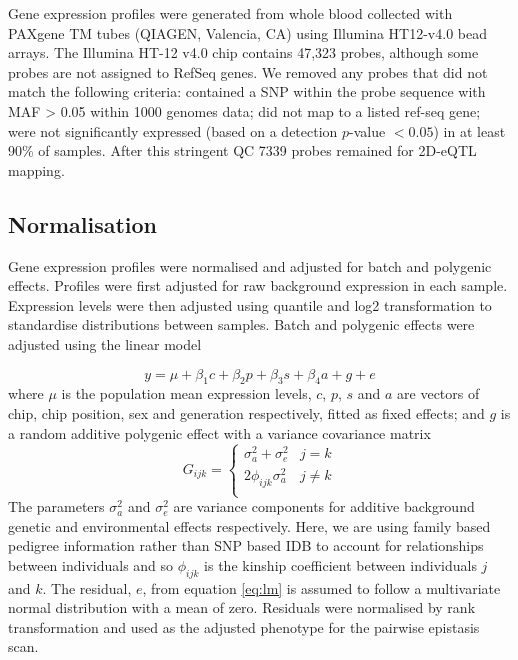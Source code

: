 \documentclass{article}
\begin{document}
Gene expression profiles were generated from whole blood collected with PAXgene TM tubes (QIAGEN, Valencia, CA) using Illumina HT12-v4.0 bead arrays. The Illumina HT-12 v4.0 chip contains 47,323 probes, although some probes are not assigned to RefSeq genes. We removed any probes that did not match the following criteria: contained a SNP within the probe sequence with MAF > 0.05 within 1000 genomes data; did not map to a listed ref-seq gene; were not significantly expressed (based on a detection $p$-value $< 0.05$) in at least 90\% of samples. After this stringent QC 7339 probes remained for 2D-eQTL mapping.


\subsection{Normalisation}

Gene expression profiles were normalised and adjusted for batch and polygenic effects. Profiles were first adjusted for raw background expression in each sample. Expression levels were then adjusted using quantile and log2 transformation to standardise distributions between samples. Batch and polygenic effects were adjusted using the linear model

\begin{equation}
y = \mu + \beta_{1}c + \beta_{2}p + \beta_{3}s + \beta_{4}a + g + e
\label{eq:lm}
\end{equation}
where $\mu$ is the population mean expression levels, $c$, $p$, $s$ and $a$ are vectors of chip, chip position, sex and generation respectively, fitted as fixed effects; and $g$ is a random additive polygenic effect with a variance covariance matrix 
\begin{equation}
G_{ijk} = \left \{ 
\begin{array}{ll}
\sigma _a ^2 + \sigma _e ^2&        j = k \\ 
2\phi _{ijk} \sigma _a ^2& 			j \neq k \\
\end{array} \right.
\end{equation}
The parameters $\sigma_a^2$ and $\sigma_e^2$ are variance components for additive background genetic and environmental effects respectively. Here, we are using family based pedigree information rather than SNP based IDB to account for relationships between individuals and so $\phi _{ijk}$ is the kinship coefficient between individuals $j$ and $k$. The residual, $e$, from equation \ref{eq:lm} is assumed to follow a multivariate normal distribution with a mean of zero. Residuals were normalised by rank transformation and used as the adjusted phenotype for the pairwise epistasis scan. 
\end{document}
